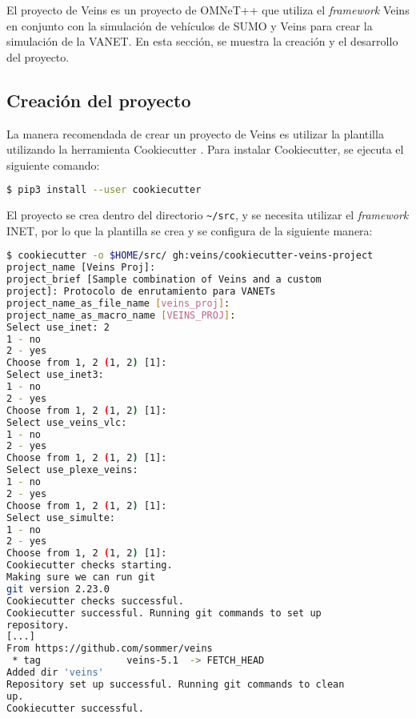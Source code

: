 \label{sec:proyecto_omnet}

El proyecto de Veins es un proyecto de OMNeT++ que utiliza el
\textit{framework} Veins en conjunto con la simulación de vehículos de SUMO y
Veins para crear la simulación de la VANET. En esta sección, se muestra la
creación y el desarrollo del proyecto.


\subsection{Creación del proyecto}

\label{subsec:creacion_proyecto}

\begin{sloppypar}
La manera recomendada de crear un proyecto de Veins es utilizar la plantilla
 utilizando la herramienta Cookiecutter
\cite{Cookiecutter}. Para instalar Cookiecutter, se ejecuta el siguiente
comando:
\end{sloppypar}

\begin{lstlisting}[language=bash]
$ pip3 install --user cookiecutter
\end{lstlisting}

El proyecto  se crea dentro del directorio
{\lstinline[language=bash]!~/src!}, y se necesita utilizar el
\textit{framework} INET, por lo que la plantilla se crea y se configura de la
siguiente manera:

\begin{lstlisting}[language=bash]
$ cookiecutter -o $HOME/src/ gh:veins/cookiecutter-veins-project
project_name [Veins Proj]:
project_brief [Sample combination of Veins and a custom
project]: Protocolo de enrutamiento para VANETs
project_name_as_file_name [veins_proj]:
project_name_as_macro_name [VEINS_PROJ]:
Select use_inet: 2
1 - no
2 - yes
Choose from 1, 2 (1, 2) [1]:
Select use_inet3:
1 - no
2 - yes
Choose from 1, 2 (1, 2) [1]:
Select use_veins_vlc:
1 - no
2 - yes
Choose from 1, 2 (1, 2) [1]:
Select use_plexe_veins:
1 - no
2 - yes
Choose from 1, 2 (1, 2) [1]:
Select use_simulte:
1 - no
2 - yes
Choose from 1, 2 (1, 2) [1]:
Cookiecutter checks starting.
Making sure we can run git
git version 2.23.0
Cookiecutter checks successful.
Cookiecutter successful. Running git commands to set up
repository.
[...]
From https://github.com/sommer/veins
 * tag               veins-5.1  -> FETCH_HEAD
Added dir 'veins'
Repository set up successful. Running git commands to clean
up.
Cookiecutter successful.
\end{lstlisting}

